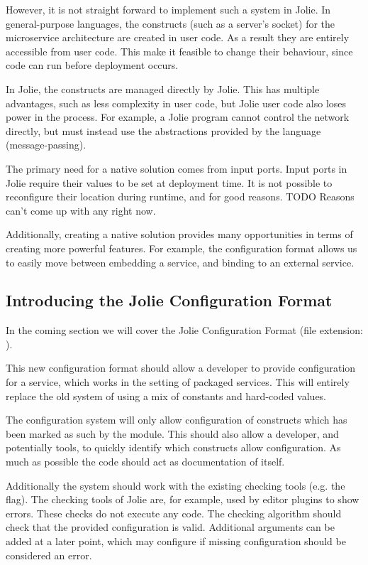 
However, it is not straight forward to implement such a system in Jolie.
In general-purpose languages, the constructs (such as a server's socket) for
the microservice architecture are created in user code. As a result they are
entirely accessible from user code. This make it feasible to change their
behaviour, since code can run before deployment occurs.

In Jolie, the constructs are managed directly by Jolie. This has multiple
advantages, such as less complexity in user code, but Jolie user code also
loses power in the process. For example, a Jolie program cannot control the
network directly, but must instead use the abstractions provided by the
language (message-passing).

The primary need for a native solution comes from input ports. Input ports in
Jolie require their values to be set at deployment time. It is not possible to
reconfigure their location during runtime, and for good reasons. TODO Reasons
can't come up with any right now.

Additionally, creating a native solution provides many opportunities in terms of
creating more powerful features. For example, the configuration format allows
us to easily move between embedding a service, and binding to an external
service.

\subsection{Introducing the Jolie Configuration Format}
\label{sec:conf_units}

In the coming section we will cover the Jolie Configuration Format (file
extension: ).


This new configuration format should allow a developer to provide configuration
for a service, which works in the setting of packaged services. This will
entirely replace the old system of using a mix of constants and hard-coded
values.

The configuration system will only allow configuration of constructs which has
been marked as such by the module. This should also allow a developer, and
potentially tools, to quickly identify which constructs allow configuration.
As much as possible the code should act as documentation of itself.

Additionally the system should work with the existing checking tools (e.g. the
 flag). The checking tools of Jolie are, for example,
used by editor plugins to show errors. These checks do not execute
any code. The checking algorithm should check that the provided
configuration is valid. Additional arguments can be added at a
later point, which may configure if missing configuration should
be considered an error.

